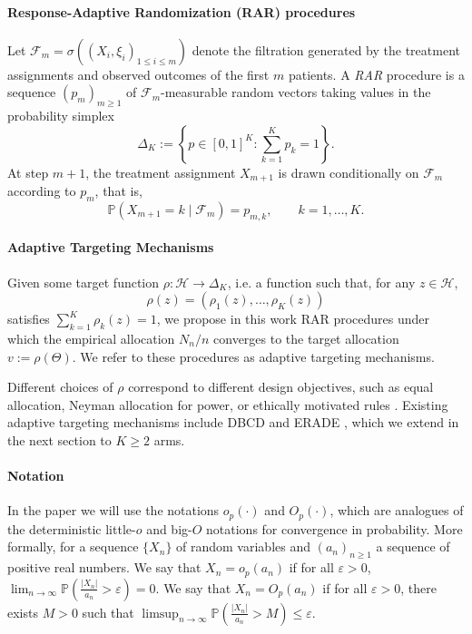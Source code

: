 \paragraph*{Response-Adaptive Randomization (RAR) procedures}

Let $\mathcal{F}_m = \sigma\!\left((X_i,\xi_i)_{1 \le i \le m}\right)$ 
denote the filtration generated by the treatment assignments and observed 
outcomes of the first $m$ patients. A \textit{RAR} procedure is a sequence
$(p_m)_{m\ge1}$ of $\mathcal{F}_m$-measurable random vectors taking values 
in the probability simplex
\[
\Delta_K := \left\{ p \in [0,1]^K : \sum_{k=1}^K p_k = 1 \right\}.
\]
At step $m+1$, the treatment assignment $X_{m+1}$ is drawn conditionally 
on $\mathcal{F}_m$ according to $p_m$, that is,
\[
\mathbb{P}(X_{m+1} = k \mid \mathcal{F}_m) = p_{m,k},
\qquad k = 1,\dots,K.
\]


\paragraph*{Adaptive Targeting Mechanisms} Given some target function $\rho : \mathcal{H} \rightarrow \Delta_K$, i.e. a function such that, for any $z \in \mathcal{H}$,
\[
\rho(z) = (\rho_1(z), \ldots, \rho_K(z))
\]
satisfies $\sum_{k=1}^{K}\rho_{k}(z)=1$, we propose in this work RAR procedures under which the empirical allocation $N_n/n$ converges to the target allocation $v := \rho(\Theta)$. We refer to these procedures as adaptive targeting mechanisms.

Different choices of $\rho$ correspond to different design objectives, such as equal allocation, Neyman allocation for power, or ethically motivated rules \citep{pin2024response}.
Existing adaptive targeting mechanisms include DBCD \citep{hu2004asymptotic} and ERADE \citep{hu2006theory}, which we extend in the next section to $K \geq 2$ arms.


\paragraph*{Notation}
In the paper we will use the notations $o_p(\cdot)$ and $O_p(\cdot)$, which are analogues of the deterministic little-$o$ and big-$O$ notations for convergence in probability.
More formally, for a sequence $\{X_n\}$ of random variables and $\left(a_n\right)_{n \geq 1}$ a sequence of positive real numbers.
We say that $X_n = o_p(a_n)$ if for all $\varepsilon > 0$, \(\lim_{n \to \infty} \mathbb{P}\!\left( \frac{|X_n|}{a_n} > \varepsilon \right) = 0.\)
We say that $X_n = O_p(a_n)$ if for all $\varepsilon > 0$, there exists $M > 0$ such that \(\limsup_{n \to \infty} \mathbb{P}\!\left( \frac{|X_n|}{a_n} > M \right) \leq \varepsilon.\)		
	
